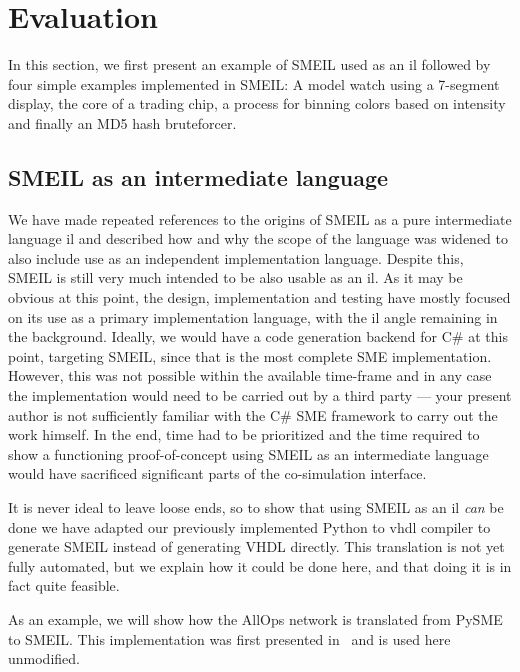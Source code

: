 \chapter{Evaluation}

In this section, we first present an example of SMEIL used as an \gls{il}
followed by four simple examples implemented in SMEIL: A model watch using a
7-segment display, the core of a trading chip, a process for binning colors
based on intensity and finally an MD5 hash bruteforcer.


\section{SMEIL as an intermediate language}
\label{sec:smeilil}
We have made repeated references to the origins of SMEIL as a pure intermediate
language \gls{il} and described how and why the scope of the language was
widened to also include use as an independent implementation language. Despite
this, SMEIL is still very much intended to be also usable as an \gls{il}. As it
may be obvious at this point, the design, implementation and testing have mostly
focused on its use as a primary implementation language, with the \gls{il} angle
remaining in the background. Ideally, we would have a code generation backend
for C\# at this point, targeting SMEIL, since that is the most complete SME
implementation. However, this was not possible within the available time-frame
and in any case the implementation would need to be carried out by a third party
--- your present author is not sufficiently familiar with the C\# SME framework
to carry out the work himself. In the end, time had to be prioritized and the
time required to show a functioning proof-of-concept using SMEIL as an
intermediate language would have sacrificed significant parts of the
co-simulation interface.

It is never ideal to leave loose ends, so to show that using SMEIL as an
\gls{il} {\itshape can} be done we have adapted our previously implemented
Python to \gls{vhdl} compiler to generate SMEIL instead of generating VHDL
directly. This translation is not yet fully automated, but we explain how it
could be done here, and that doing it is in fact quite feasible.

As an example, we will show how the AllOps network is translated from PySME to
SMEIL. This implementation was first presented in~\cite{asheim2016vhdl} and is
used here unmodified. 


